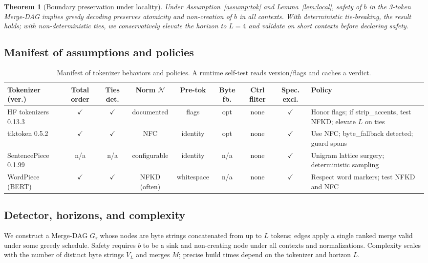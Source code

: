 \documentclass{article}
\newtheorem{theorem}{Theorem}
\begin{document}
\begin{theorem}[Boundary preservation under locality]\label{thm:bpe}
Under Assumption~\ref{assump:tok} and Lemma~\ref{lem:local}, safety of $b$ in the 3-token Merge-DAG implies greedy decoding preserves atomicity and non-creation of $b$ in all contexts. With deterministic tie-breaking, the result holds; with non-deterministic ties, we conservatively elevate the horizon to $L=4$ and validate on short contexts before declaring safety.
\end{theorem}

\subsection{Manifest of assumptions and policies}\label{sec:manifest}
\begin{table}[h]
\centering
\small
\begin{tabular}{@{}lcccccccl@{}}
\toprule
Tokenizer (ver.) & Total order & Ties det. & Norm $\mathcal{N}$ & Pre-tok & Byte fb. & Ctrl filter & Spec. excl. & Policy \\
\midrule
HF tokenizers 0.13.3 & $\checkmark$ & $\checkmark$ & documented & flags & opt & none & $\checkmark$ & Honor flags; if strip\_accents, test NFKD; elevate $L$ on ties \\
tiktoken 0.5.2 & $\checkmark$ & $\checkmark$ & NFC & identity & opt & none & $\checkmark$ & Use NFC; byte\_fallback detected; guard spans \\
SentencePiece 0.1.99 & n/a & n/a & configurable & identity & n/a & none & $\checkmark$ & Unigram lattice surgery; deterministic sampling \\
WordPiece (BERT) & $\checkmark$ & $\checkmark$ & NFKD (often) & whitespace & n/a & none & $\checkmark$ & Respect word markers; test NFKD and NFC \\
\bottomrule
\end{tabular}
\caption{Manifest of tokenizer behaviors and policies. A runtime self-test reads version/flags and caches a verdict.}
\label{tab:manifest}
\end{table}

\subsection{Detector, horizons, and complexity}\label{sec:detector}
We construct a Merge-DAG $G_\tau$ whose nodes are byte strings concatenated from up to $L$ tokens; edges apply a single ranked merge valid under some greedy schedule. Safety requires $b$ to be a sink and non-creating node under all contexts and normalizations. Complexity scales with the number of distinct byte strings $V_L$ and merges $M$; precise build times depend on the tokenizer and horizon $L$.
\end{document}
